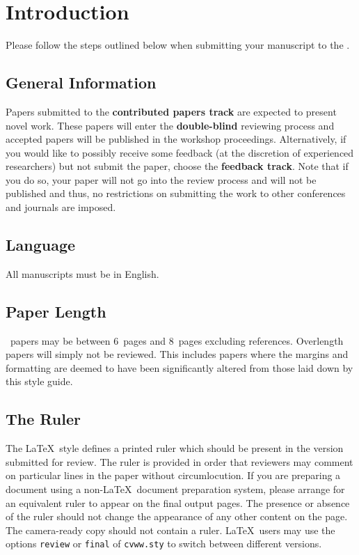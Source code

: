 \section{Introduction}
\label{sec:intro}

Please follow the steps outlined below when submitting your manuscript to the \thisCVWW.

\subsection{General Information}

Papers submitted to the \textbf{contributed papers track} are expected to present novel work.
These papers will enter the \textbf{double-blind} reviewing process and accepted papers will be published in the workshop proceedings.
Alternatively, if you would like to possibly receive some feedback (at the discretion of experienced researchers) but not submit the paper, choose the \textbf{feedback track}.
Note that if you do so, your paper will not go into the review process and will not be published and thus, no restrictions on submitting the work to other conferences and journals are imposed.


\subsection{Language}

All manuscripts must be in English.

\subsection{Paper Length} 

\confName\ papers may be between 6~pages and 8~pages excluding references.
Overlength papers will simply not be reviewed.
This includes papers where the margins and formatting are deemed to have been significantly altered from those laid down by this style guide.


\subsection{The Ruler}

The \LaTeX\ style defines a printed ruler which should be present in the version submitted for review.
The ruler is provided in order that reviewers may comment on particular lines in the paper without circumlocution.
If you are preparing a document using a non-\LaTeX\ document preparation system, please arrange for an equivalent ruler to appear on the final output pages.
The presence or absence of the ruler should not change the appearance of any other content on the page.
The camera-ready copy should not contain a ruler.
\LaTeX\ users may use the options \texttt{review} or \texttt{final} of \texttt{cvww.sty} to switch between different versions.


